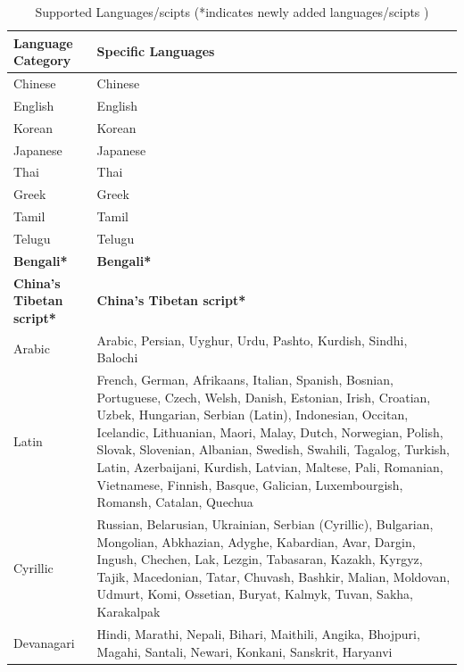 \documentclass[11pt, a4paper,logo,  copyright, nonumbering]{paddleocr}
\begin{document}
\begin{table}[ht]
\centering
\begin{tabular}{>{\centering\arraybackslash}m{}|>{\centering\arraybackslash}m{}}
\toprule
\textbf{Language Category} & \textbf{Specific Languages} \\
\midrule
Chinese & Chinese \\
\midrule
English & English \\
\midrule
Korean & Korean \\
\midrule
Japanese & Japanese \\
\midrule
Thai & Thai\\
\midrule
Greek & Greek \\
\midrule
Tamil & Tamil \\
\midrule
Telugu & Telugu \\
\midrule
\cellcolor{red!15}\textbf{Bengali*} & \cellcolor{red!15}\textbf{Bengali*} \\
\midrule
\cellcolor{red!15}\textbf{China's Tibetan script*} & \cellcolor{red!15}\textbf{China's Tibetan script*} \\
\midrule
Arabic & Arabic, Persian, Uyghur, Urdu, Pashto, Kurdish, Sindhi, Balochi \\
\midrule
Latin & French, German, Afrikaans, Italian, Spanish, Bosnian, Portuguese, Czech, Welsh, Danish, Estonian, Irish, Croatian, Uzbek, Hungarian, Serbian (Latin), Indonesian, Occitan, Icelandic, Lithuanian, Maori, Malay, Dutch, Norwegian, Polish, Slovak, Slovenian, Albanian, Swedish, Swahili, Tagalog, Turkish, Latin, Azerbaijani, Kurdish, Latvian, Maltese, Pali, Romanian, Vietnamese, Finnish, Basque, Galician, Luxembourgish, Romansh, Catalan, Quechua \\
\midrule
Cyrillic & Russian, Belarusian, Ukrainian, Serbian (Cyrillic), Bulgarian, Mongolian, Abkhazian, Adyghe, Kabardian, Avar, Dargin, Ingush, Chechen, Lak, Lezgin, Tabasaran, Kazakh, Kyrgyz, Tajik, Macedonian, Tatar, Chuvash, Bashkir, Malian, Moldovan, Udmurt, Komi, Ossetian, Buryat, Kalmyk, Tuvan, Sakha, Karakalpak \\
\midrule
Devanagari & Hindi, Marathi, Nepali, Bihari, Maithili, Angika, Bhojpuri, Magahi, Santali, Newari, Konkani, Sanskrit, Haryanvi \\
\bottomrule
\end{tabular}
   \caption{Supported Languages/scipts (*indicates newly added languages/scipts )}
       \label{tab:supported_language}
\end{table}
\end{document}
